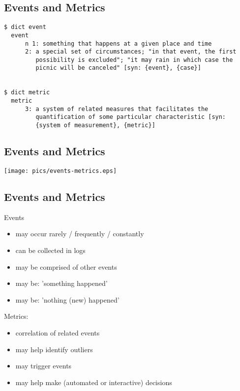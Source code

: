 \documentclass[xga]{xdvislides}
\begin{document}
\subsection{Events and Metrics}
\vspace*{\fill}
\begin{verbatim}
$ dict event
  event
      n 1: something that happens at a given place and time
      2: a special set of circumstances; "in that event, the first
         possibility is excluded"; "it may rain in which case the
         picnic will be canceled" [syn: {event}, {case}]


$ dict metric
  metric
      3: a system of related measures that facilitates the
         quantification of some particular characteristic [syn:
         {system of measurement}, {metric}]

\end{verbatim}
\vspace*{\fill}

\subsection{Events and Metrics}
\begin{center}
	\texttt{[image: pics/events-metrics.eps]}
\end{center}

\subsection{Events and Metrics}
Events
\begin{itemize}
	\item may occur rarely / frequently / constantly
	\item can be collected in logs
	\item may be comprised of other events
	\item may be: ’something happened’
	\item may be: ’nothing (new) happened’
\end{itemize}
\addvspace{.5in}

Metrics:
\begin{itemize}
	\item correlation of related events
	\item may help identify outliers
	\item may trigger events
	\item may help make (automated or interactive) decisions
\end{itemize}
\end{document}
